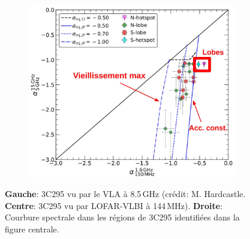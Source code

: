 \begin{figure}[h!]
\begin{subfigure}{.3\textwidth}
		\label{fig.ccplot.diag}
	\end{subfigure}
	\hfill
	\begin{subfigure}{.35\textwidth}
		\vspace{0.3cm}
		\includegraphics[width=\linewidth]{ProjetRecherche/avg_all_ccplot_annotated.jpeg}
	\end{subfigure}
	\hfill
	\caption{\textbf{Gauche}: 3C295 vu par le VLA \`a 8.5\,GHz  (cr\'edit: M. Hardcastle. \textbf{Centre}: 3C295 vu par LOFAR-VLBI \`a 144\,MHz). \textbf{Droite}: Courbure spectrale dans les r\'egions de 3C295 identifi\'ees dans la figure centrale.}
	\label{fig.3C295}	
\end{figure}

%
%




